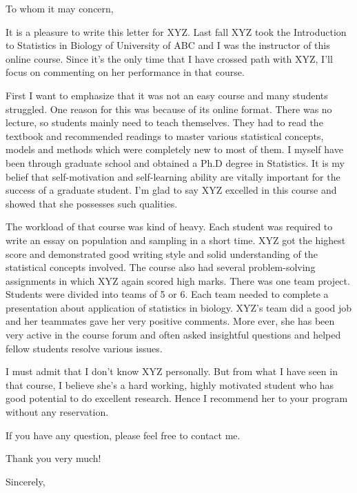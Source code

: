 \documentclass[a4paper, 12pt]{letter}
\begin{document}
\begin{letter}{ 
}



\opening{To whom it may concern,}
It is a pleasure to write this letter for XYZ. Last fall XYZ took the Introduction to Statistics in Biology of University of ABC and
I was the instructor of this online course. Since it's the only time that I have crossed path with XYZ, I'll focus on commenting on her performance in that course.

First I want to emphasize that it was not an easy course and many students struggled. One reason for this was because of its online format. There was no lecture, so students mainly need to teach themselves. They had to read the textbook and recommended readings to master various statistical concepts, models and methods which were completely new to most of them. I myself have been through graduate school and obtained a Ph.D degree in Statistics. It is my belief that self-motivation and self-learning ability are vitally important for the success of a graduate student. I'm glad to say XYZ excelled in this course and showed that she possesses such qualities. 

The workload of that course was kind of heavy. Each student was required to write an essay on population and sampling in a short time. 
XYZ got the highest score and demonstrated good writing style and solid understanding of the statistical concepts involved. The course also had several problem-solving assignments in which XYZ again scored high marks. 
There was one team project. Students were divided into teams of 5 or 6. Each team needed to complete a presentation about application of statistics in biology.
XYZ's team did a good job and her teammates gave her very positive comments. More ever, she has been very active in the course forum and often asked insightful questions and helped fellow students resolve various issues. 

I must admit that I don't know XYZ personally. But from what I have seen in that course, 
I believe she's a hard working, highly motivated student who has good potential to do excellent research. Hence I recommend her  to your program without any reservation.

If you have any question, please feel free to contact me.

Thank you very much!
\closing{Sincerely,}
\end{letter}
\signature{Anhua Lin}
\end{document}

